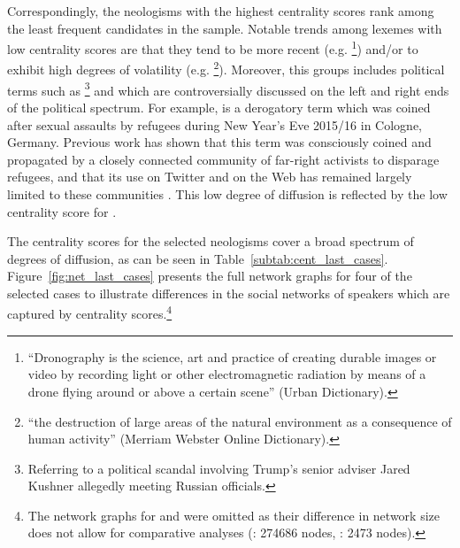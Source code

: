 \documentclass[
  a4paper,
  abstract=on,
  captions=tableabove
  ]{scrartcl}
\begin{document}
      Correspondingly, the neologisms with the highest centrality scores rank among the least frequent candidates in the sample. Notable trends among lexemes with low centrality scores are that they tend to be more recent (e.g. \footnote{\enquote{Dronography is the science, art and practice of creating durable images or video by recording light or other electromagnetic radiation by means of a drone flying around or above a certain scene} (Urban Dictionary).}) and/or to exhibit high degrees of volatility (e.g. \footnote{\enquote{the destruction of large areas of the natural environment as a consequence of human activity} (Merriam Webster Online Dictionary).}). Moreover, this groups includes political terms such as \footnote{Referring to a political scandal involving Trump's senior adviser Jared Kushner allegedly meeting Russian officials.} and  which are controversially discussed on the left and right ends of the political spectrum. For example,  is a derogatory term which was coined after sexual assaults by refugees during New Year's Eve 2015/16 in Cologne, Germany. Previous work has shown that this term was consciously coined and propagated by a closely connected community of far-right activists to disparage refugees, and that its use on Twitter and on the Web has remained largely limited to these communities \parencite{Wurschinger2016UsingWeb}. This low degree of diffusion is reflected by the low centrality score for .

      The centrality scores for the selected neologisms cover a broad spectrum of degrees of diffusion, as can be seen in Table~\ref{subtab:cent_last_cases}. Figure~\ref{fig:net_last_cases} presents the full network graphs for four of the selected cases to illustrate differences in the social networks of speakers which are captured by centrality scores.\footnote{The network graphs for  and  were omitted as their difference in network size does not allow for comparative analyses (: \num{274686} nodes, : \num{2473} nodes).}  
\end{document}
